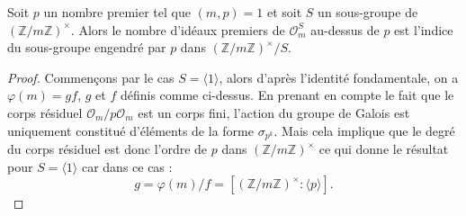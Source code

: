 \documentclass[a4paper]{article} %
\numberwithin{section}{part}
\numberwithin{equation}{section}
\newcommand\zmodninv[1]{(\mathbb{Z}/#1\mathbb{Z})^{\times}}
\newcommand\EO{\mathcal{O}}
\newcommand\groupgen[1]{\langle{#1}\rangle}
\begin{document}
\begin{lem}
\label{lem:nbprimeabove}
Soit $p$ un nombre premier tel que $(m, p) = 1$ et soit $S$ un sous-groupe de
$\zmodninv{m}$. Alors le nombre d'idéaux premiers de $\EO_m^S$ au-dessus de $p$ 
est l'indice du sous-groupe engendré par $p$ dans $\zmodninv{m}/S$.
\end{lem}
\begin{proof}
Commençons par le cas $S = \groupgen{1}$, alors d'après l'identité fondamentale,
on a $\varphi(m) = gf$, $g$ et $f$ définis comme ci-dessus. En prenant en compte
le fait que le corps résiduel $\EO_m/p\EO_m$ est un corps fini, l'action du 
groupe de Galois est uniquement constitué d'éléments de la forme $\sigma_{p^k}$.
Mais cela implique que le degré du corps résiduel est donc l'ordre de $p$ dans 
$\zmodninv{m}$ ce qui donne le résultat pour $S = \groupgen{1}$ car dans ce cas 
:
\begin{equation}
g = \varphi(m)/f = [\zmodninv{m}:\groupgen{p}].
\end{equation}


\end{proof}
\end{document}
